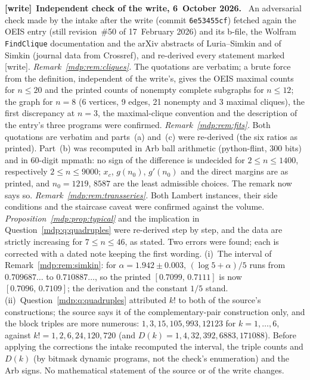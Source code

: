 \documentclass[11pt,letterpaper]{article}
\numberwithin{equation}{section}
\theoremstyle{remark}\newtheorem{remark}[theorem]{Remark}
\newcommand{\file}[1]{\nolinkurl{#1}}
\newenvironment{writenote}[1][]{\par\smallskip\begingroup\small
 \noindent\textbf{[write]}\if\relax\detokenize{#1}\relax\else~\textbf{#1.}\fi\ }%
 {\par\endgroup\smallskip}
\begin{document}
\begin{writenote}[Independent check of the write, 6~October 2026]
An adversarial check made by the intake after the write (commit
\file{6e53455cf}) fetched again the OEIS entry (still revision~\#50 of
17~February 2026) and its b-file, the Wolfram \texttt{FindClique}
documentation and the arXiv abstracts of Luria--Simkin and of Simkin (journal
data from Crossref), and re-derived every statement marked [write].
\emph{Remark~\ref{mdp:rem:cliques}.} The quotations are verbatim; a brute
force from the definition, independent of the write's, gives the OEIS maximal
counts for $n\le20$ and the printed counts of nonempty complete subgraphs for
$n\le12$; the graph for $n=8$ (6 vertices, 9 edges, 21 nonempty and 3 maximal
cliques), the first discrepancy at $n=3$, the maximal-clique convention and
the description of the entry's three programs were confirmed.
\emph{Remark~\ref{mdp:rem:fits}.} Both quotations are verbatim and parts~(a)
and~(c) were re-derived (the six ratios as printed). Part~(b) was recomputed
in Arb ball arithmetic (python-flint, 300 bits) and in 60-digit mpmath: no
sign of the difference is undecided for $2\le n\le1400$, respectively
$2\le n\le9000$; $x_c$, $g(n_0)$, $g'(n_0)$ and the direct margins are as
printed, and $n_0=1219$, $8587$ are the least admissible choices. The remark
now says so. \emph{Remark~\ref{mdp:rem:transseries}.} Both Lambert instances,
their side conditions and the staircase caveat were confirmed against the
volume. \emph{Proposition~\ref{mdp:prop:typical}} and the implication in
Question~\ref{mdp:q:quadruples} were re-derived step by step, and the data
are strictly increasing for $7\le n\le46$, as stated. Two errors were found;
each is corrected with a dated note keeping the first wording.
(i)~The interval of Remark~\ref{mdp:rem:simkin}: for
$\alpha=1.942\pm0.003$, $(\log5+\alpha)/5$ runs from $0.709687\ldots$ to
$0.710887\ldots$, so the printed $[0.7099,\,0.7111]$ is now
$[0.7096,\,0.7109]$; the derivation and the constant $1/5$ stand.
(ii)~Question~\ref{mdp:q:quadruples} attributed $k!$ to both of the source's
constructions; the source says it of the complementary-pair construction
only, and the block triples are more numerous: $1,3,15,105,993,12123$ for
$k=1,\dots,6$, against $k!=1,2,6,24,120,720$ (and
$D(k)=1,4,32,392,6883,171088$). Before applying the corrections the intake
recomputed the interval, the triple counts and $D(k)$ (by bitmask dynamic
programs, not the check's enumeration) and the Arb signs. No mathematical
statement of the source or of the write changes.
\end{writenote}
\end{document}
